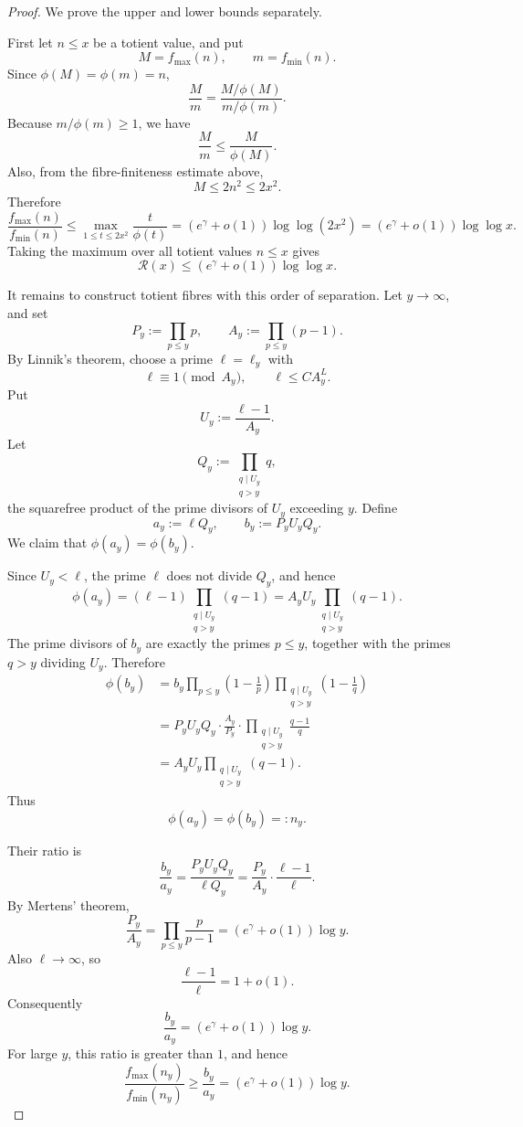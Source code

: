 \documentclass[11pt,a4paper]{amsart}
\begin{document}
\begin{proof}
We prove the upper and lower bounds separately.

First let \(n\le x\) be a totient value, and put
\[
M=f_{\max}(n),
\qquad
m=f_{\min}(n).
\]
Since \(\phi(M)=\phi(m)=n\),
\[
\frac M m
=
\frac{M/\phi(M)}{m/\phi(m)}.
\]
Because \(m/\phi(m)\ge 1\), we have
\[
\frac M m
\le \frac M{\phi(M)}.
\]
Also, from the fibre-finiteness estimate above,
\[
M\le 2n^2\le 2x^2.
\]
Therefore
\[
\frac{f_{\max}(n)}{f_{\min}(n)}
\le
\max_{1\le t\le 2x^2}\frac t{\phi(t)}
=
(e^\gamma+o(1))\log\log(2x^2)
=
(e^\gamma+o(1))\log\log x.
\]
Taking the maximum over all totient values \(n\le x\) gives
\[
\mathcal R(x)
\le
(e^\gamma+o(1))\log\log x.
\]

It remains to construct totient fibres with this order of separation. Let \(y\to\infty\), and set
\[
P_y:=\prod_{p\le y}p,
\qquad
A_y:=\prod_{p\le y}(p-1).
\]
By Linnik's theorem, choose a prime \(\ell=\ell_y\) with
\[
\ell\equiv 1\pmod {A_y},
\qquad
\ell\le C A_y^L.
\]
Put
\[
U_y:=\frac{\ell-1}{A_y}.
\]
Let
\[
Q_y:=\prod_{\substack{q\mid U_y\\ q>y}}q,
\]
the squarefree product of the prime divisors of \(U_y\) exceeding \(y\). Define
\[
a_y:=\ell Q_y,
\qquad
b_y:=P_y U_y Q_y.
\]
We claim that \(\phi(a_y)=\phi(b_y)\).

Since \(U_y<\ell\), the prime \(\ell\) does not divide \(Q_y\), and hence
\[
\phi(a_y)
=
(\ell-1)\prod_{\substack{q\mid U_y\\ q>y}}(q-1)
=
A_yU_y\prod_{\substack{q\mid U_y\\ q>y}}(q-1).
\]
The prime divisors of \(b_y\) are exactly the primes \(p\le y\), together with the primes \(q>y\) dividing \(U_y\). Therefore
\[
\begin{aligned}
\phi(b_y)
&=
b_y
\prod_{p\le y}\left(1-\frac1p\right)
\prod_{\substack{q\mid U_y\\ q>y}}\left(1-\frac1q\right)  \\
&=
P_yU_yQ_y\cdot \frac{A_y}{P_y}
\cdot
\prod_{\substack{q\mid U_y\\ q>y}}\frac{q-1}{q} \\
&=
A_yU_y
\prod_{\substack{q\mid U_y\\ q>y}}(q-1).
\end{aligned}
\]
Thus
\[
\phi(a_y)=\phi(b_y)=:n_y.
\]

Their ratio is
\[
\frac{b_y}{a_y}
=
\frac{P_yU_yQ_y}{\ell Q_y}
=
\frac{P_y}{A_y}\cdot \frac{\ell-1}{\ell}.
\]
By Mertens' theorem,
\[
\frac{P_y}{A_y}
=
\prod_{p\le y}\frac p{p-1}
=
(e^\gamma+o(1))\log y.
\]
Also \(\ell\to\infty\), so
\[
\frac{\ell-1}{\ell}=1+o(1).
\]
Consequently
\[
\frac{b_y}{a_y}
=
(e^\gamma+o(1))\log y.
\]
For large \(y\), this ratio is greater than \(1\), and hence
\[
\frac{f_{\max}(n_y)}{f_{\min}(n_y)}
\ge
\frac{b_y}{a_y}
=
(e^\gamma+o(1))\log y.
\]


\end{proof}
\end{document}
